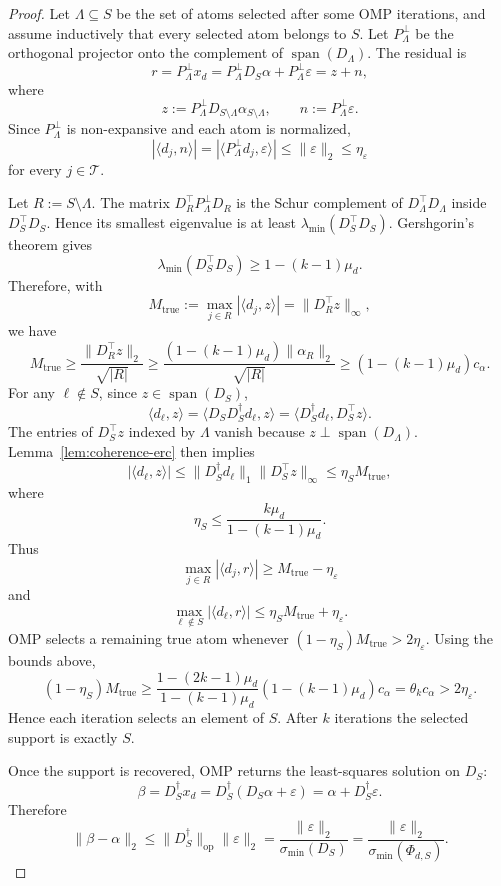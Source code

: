\documentclass{article}
\theoremstyle{plain}
\theoremstyle{definition}
\theoremstyle{remark}
\begin{document}
\begin{proof}
Let $\Lambda\subseteq S$ be the set of atoms selected after some OMP iterations, and assume inductively that every selected atom belongs to $S$. Let $P_\Lambda^\perp$ be the orthogonal projector onto the complement of $\operatorname{span}(D_\Lambda)$. The residual is
\[
r=P_\Lambda^\perp x_d
=
P_\Lambda^\perp D_S\alpha+P_\Lambda^\perp\varepsilon
=
z+n,
\]
where
\[
z:=P_\Lambda^\perp D_{S\setminus\Lambda}\alpha_{S\setminus\Lambda},
\qquad
n:=P_\Lambda^\perp\varepsilon.
\]
Since $P_\Lambda^\perp$ is non-expansive and each atom is normalized,
\[
|\langle d_j,n\rangle|
=
|\langle P_\Lambda^\perp d_j,\varepsilon\rangle|
\le
\|\varepsilon\|_2
\le
\eta_\varepsilon
\]
for every $j\in\mathcal{T}$.

Let $R:=S\setminus\Lambda$. The matrix $D_R^\top P_\Lambda^\perp D_R$ is the Schur complement of $D_\Lambda^\top D_\Lambda$ inside $D_S^\top D_S$. Hence its smallest eigenvalue is at least $\lambda_{\min}(D_S^\top D_S)$. Gershgorin's theorem gives
\[
\lambda_{\min}(D_S^\top D_S)
\ge
1-(k-1)\mu_d.
\]
Therefore, with
\[
M_{\mathrm{true}}:=\max_{j\in R}|\langle d_j,z\rangle|=\|D_R^\top z\|_\infty,
\]
we have
\[
M_{\mathrm{true}}
\ge
\frac{\|D_R^\top z\|_2}{\sqrt{|R|}}
\ge
\frac{(1-(k-1)\mu_d)\|\alpha_R\|_2}{\sqrt{|R|}}
\ge
(1-(k-1)\mu_d)c_\alpha.
\]
For any $\ell\notin S$, since $z\in\operatorname{span}(D_S)$,
\[
\langle d_\ell,z\rangle
=
\langle D_SD_S^\dagger d_\ell,z\rangle
=
\langle D_S^\dagger d_\ell,D_S^\top z\rangle.
\]
The entries of $D_S^\top z$ indexed by $\Lambda$ vanish because $z\perp\operatorname{span}(D_\Lambda)$. Lemma~\ref{lem:coherence-erc} then implies
\[
|\langle d_\ell,z\rangle|
\le
\|D_S^\dagger d_\ell\|_1\|D_S^\top z\|_\infty
\le
\eta_S M_{\mathrm{true}},
\]
where
\[
\eta_S \le \frac{k\mu_d}{1-(k-1)\mu_d}.
\]
Thus
\[
\max_{j\in R}|\langle d_j,r\rangle|
\ge
M_{\mathrm{true}}-\eta_\varepsilon
\]
and
\[
\max_{\ell\notin S}|\langle d_\ell,r\rangle|
\le
\eta_S M_{\mathrm{true}}+\eta_\varepsilon.
\]
OMP selects a remaining true atom whenever $(1-\eta_S)M_{\mathrm{true}}>2\eta_\varepsilon$. Using the bounds above,
\[
(1-\eta_S)M_{\mathrm{true}}
\ge
\frac{1-(2k-1)\mu_d}{1-(k-1)\mu_d}(1-(k-1)\mu_d)c_\alpha
=
\theta_k c_\alpha
>
2\eta_\varepsilon.
\]
Hence each iteration selects an element of $S$. After $k$ iterations the selected support is exactly $S$.

Once the support is recovered, OMP returns the least-squares solution on $D_S$:
\[
\beta=D_S^\dagger x_d=D_S^\dagger(D_S\alpha+\varepsilon)=\alpha+D_S^\dagger\varepsilon.
\]
Therefore
\[
\|\beta-\alpha\|_2
\le
\|D_S^\dagger\|_{\mathrm{op}}\|\varepsilon\|_2
=
\frac{\|\varepsilon\|_2}{\sigma_{\min}(D_S)}
=
\frac{\|\varepsilon\|_2}{\sigma_{\min}(\Phi_{d,S})}.
\]
\end{proof}
\end{document}
